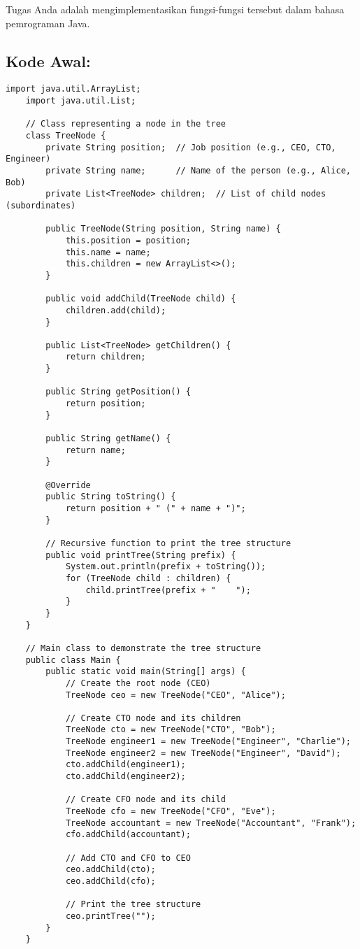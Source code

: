 Tugas Anda adalah mengimplementasikan fungsi-fungsi tersebut dalam bahasa pemrograman Java.

\subsection{Kode Awal:}
\begin{lstlisting}[style=JavaStyle]
	import java.util.ArrayList;
	import java.util.List;
	
	// Class representing a node in the tree
	class TreeNode {
		private String position;  // Job position (e.g., CEO, CTO, Engineer)
		private String name;      // Name of the person (e.g., Alice, Bob)
		private List<TreeNode> children;  // List of child nodes (subordinates)
		
		public TreeNode(String position, String name) {
			this.position = position;
			this.name = name;
			this.children = new ArrayList<>();
		}
		
		public void addChild(TreeNode child) {
			children.add(child);
		}
		
		public List<TreeNode> getChildren() {
			return children;
		}
		
		public String getPosition() {
			return position;
		}
		
		public String getName() {
			return name;
		}
		
		@Override
		public String toString() {
			return position + " (" + name + ")";
		}
		
		// Recursive function to print the tree structure
		public void printTree(String prefix) {
			System.out.println(prefix + toString());
			for (TreeNode child : children) {
				child.printTree(prefix + "    ");
			}
		}
	}
	
	// Main class to demonstrate the tree structure
	public class Main {
		public static void main(String[] args) {
			// Create the root node (CEO)
			TreeNode ceo = new TreeNode("CEO", "Alice");
			
			// Create CTO node and its children
			TreeNode cto = new TreeNode("CTO", "Bob");
			TreeNode engineer1 = new TreeNode("Engineer", "Charlie");
			TreeNode engineer2 = new TreeNode("Engineer", "David");
			cto.addChild(engineer1);
			cto.addChild(engineer2);
			
			// Create CFO node and its child
			TreeNode cfo = new TreeNode("CFO", "Eve");
			TreeNode accountant = new TreeNode("Accountant", "Frank");
			cfo.addChild(accountant);
			
			// Add CTO and CFO to CEO
			ceo.addChild(cto);
			ceo.addChild(cfo);
			
			// Print the tree structure
			ceo.printTree("");
		}
	}
\end{lstlisting}



